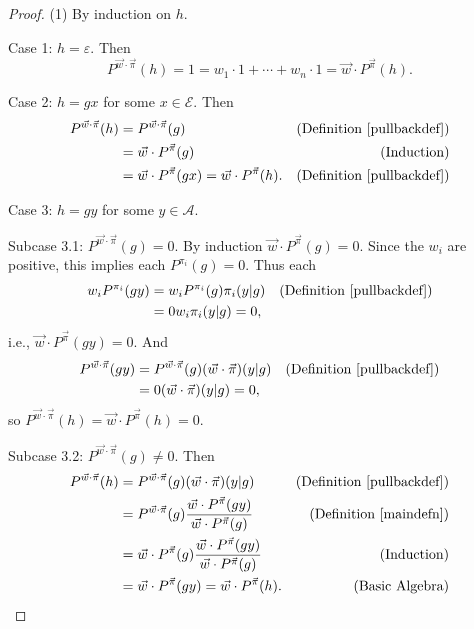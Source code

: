 \documentclass[twoside]{article}
\begin{document}
\begin{proof}
    (1) By induction on $h$.

    Case 1: $h=\varepsilon$. Then
    \[
        P^{\vec w\cdot\vec\pi}(h)=1=w_1\cdot 1+\cdots+w_n\cdot 1
        =
        \vec w\cdot {P^{\vec\pi}}(h).
    \]

    Case 2: $h=gx$ for some $x\in\mathcal E$. Then
    \begin{align*}
        P^{\vec w\cdot\vec\pi}(h)
            &= P^{\vec w\cdot\vec\pi}(g)
                &\mbox{(Definition \ref{pullbackdef})}\\
            &= \vec w\cdot {P^{\vec\pi}}(g)
                &\mbox{(Induction)}\\
            &= \vec w\cdot {P^{\vec\pi}}(gx)= \vec w\cdot{P^{\vec\pi}}(h).
                &\mbox{(Definition \ref{pullbackdef})}
    \end{align*}

    Case 3: $h=gy$ for some $y\in\mathcal A$.

    Subcase 3.1: $P^{\vec w\cdot\vec\pi}(g)=0$.
        By induction $\vec w\cdot {P^{\vec\pi}}(g)=0$.
        Since the $w_i$ are positive, this implies
        each $P^{\pi_i}(g)=0$.
        Thus each
        \begin{align*}
            w_i P^{\pi_i}(gy)
                &= w_i P^{\pi_i}(g)\pi_i(y|g)
                    &\mbox{(Definition \ref{pullbackdef})}\\
                &= 0w_i\pi_i(y|g)=0,
        \end{align*}
        i.e., $\vec w\cdot{P^{\vec\pi}}(gy)=0$.
        And
        \begin{align*}
            P^{\vec w\cdot\vec\pi}(gy)
                &= P^{\vec w\cdot\vec\pi}(g)(\vec w\cdot\vec\pi)(y|g)
                    &\mbox{(Definition \ref{pullbackdef})}\\
                &= 0(\vec w\cdot\vec\pi)(y|g) = 0,
        \end{align*}
        so $P^{\vec w\cdot\vec\pi}(h)=\vec w\cdot P^{\vec\pi}(h)=0$.

    Subcase 3.2: ${P^{\vec w\cdot\vec\pi}}(g)\not=0$. Then
    \begin{align*}
        P^{\vec w\cdot\vec\pi}(h)
            &= P^{\vec w\cdot\vec\pi}(g)(\vec w\cdot\vec\pi)(y|g)
                &\mbox{(Definition \ref{pullbackdef})}\\
            &= P^{\vec w\cdot\vec\pi}(g)
                \frac
                {\vec w\cdot {P^{\vec\pi}}(gy)}
                {\vec w\cdot {P^{\vec\pi}}(g)}
                &\mbox{(Definition \ref{maindefn})}\\
            &= \vec w\cdot {P^{\vec\pi}}(g)
                \frac
                {\vec w\cdot {P^{\vec\pi}}(gy)}
                {\vec w\cdot {P^{\vec\pi}}(g)}
                &\mbox{(Induction)}\\
            &= \vec w\cdot {P^{\vec\pi}}(gy) = \vec w\cdot {P^{\vec\pi}}(h).
                &\mbox{(Basic Algebra)}
    \end{align*}


\end{proof}
\end{document}
